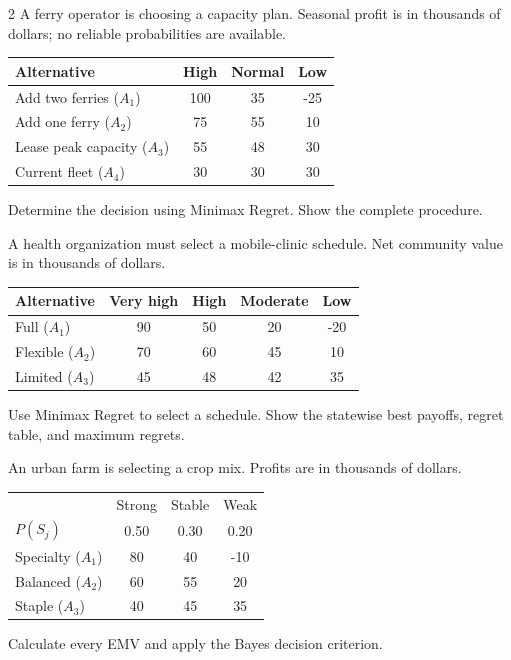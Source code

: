 \begin{multicols}{2}
		A ferry operator is choosing a capacity plan. Seasonal profit is in thousands of dollars; no reliable probabilities are available.
		\begin{center}\scriptsize\setlength{\tabcolsep}{2pt}\renewcommand{\arraystretch}{1.15}
			\begin{tabular}{lccc}\toprule
			Alternative & High & Normal & Low\\ \midrule
			Add two ferries ($A_1$)&100&35&-25\\
			Add one ferry ($A_2$)&75&55&10\\
			Lease peak capacity ($A_3$)&55&48&30\\
			Current fleet ($A_4$)&30&30&30\\ \bottomrule
			\end{tabular}
		\end{center}
		Determine the decision using Minimax Regret. Show the complete procedure.

		A health organization must select a mobile-clinic schedule. Net community value is in thousands of dollars.
		\begin{center}\scriptsize\setlength{\tabcolsep}{2pt}\renewcommand{\arraystretch}{1.15}
			\begin{tabular}{lcccc}\toprule
			Alternative & Very high & High & Moderate & Low\\ \midrule
			Full ($A_1$)&90&50&20&-20\\
			Flexible ($A_2$)&70&60&45&10\\
			Limited ($A_3$)&45&48&42&35\\ \bottomrule
			\end{tabular}
		\end{center}
		Use Minimax Regret to select a schedule. Show the statewise best payoffs, regret table, and maximum regrets.

		An urban farm is selecting a crop mix. Profits are in thousands of dollars.
		\begin{center}\scriptsize\setlength{\tabcolsep}{2pt}\renewcommand{\arraystretch}{1.15}
			\begin{tabular}{lccc}\toprule
			&Strong&Stable&Weak\\
			$P(S_j)$&0.50&0.30&0.20\\ \midrule
			Specialty ($A_1$)&80&40&-10\\
			Balanced ($A_2$)&60&55&20\\
			Staple ($A_3$)&40&45&35\\ \bottomrule
			\end{tabular}
		\end{center}
		Calculate every EMV and apply the Bayes decision criterion.


\end{multicols}
